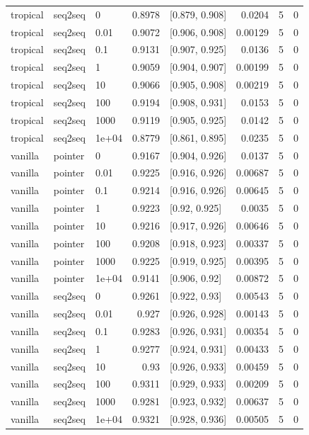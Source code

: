 \documentclass[10pt]{article}
\begin{document}
{\begin{longtable}{lllrlrrr}
tropical & seq2seq & 0 & 0.8978 & [0.879, 0.908] & 0.0204 & 5 & 0\\
tropical & seq2seq & 0.01 & 0.9072 & [0.906, 0.908] & 0.00129 & 5 & 0\\
tropical & seq2seq & 0.1 & 0.9131 & [0.907, 0.925] & 0.0136 & 5 & 0\\
tropical & seq2seq & 1 & 0.9059 & [0.904, 0.907] & 0.00199 & 5 & 0\\
tropical & seq2seq & 10 & 0.9066 & [0.905, 0.908] & 0.00219 & 5 & 0\\
tropical & seq2seq & 100 & 0.9194 & [0.908, 0.931] & 0.0153 & 5 & 0\\
tropical & seq2seq & 1000 & 0.9119 & [0.905, 0.925] & 0.0142 & 5 & 0\\
tropical & seq2seq & 1e+04 & 0.8779 & [0.861, 0.895] & 0.0235 & 5 & 0\\
vanilla & pointer & 0 & 0.9167 & [0.904, 0.926] & 0.0137 & 5 & 0\\
vanilla & pointer & 0.01 & 0.9225 & [0.916, 0.926] & 0.00687 & 5 & 0\\
vanilla & pointer & 0.1 & 0.9214 & [0.916, 0.926] & 0.00645 & 5 & 0\\
vanilla & pointer & 1 & 0.9223 & [0.92, 0.925] & 0.0035 & 5 & 0\\
vanilla & pointer & 10 & 0.9216 & [0.917, 0.926] & 0.00646 & 5 & 0\\
vanilla & pointer & 100 & 0.9208 & [0.918, 0.923] & 0.00337 & 5 & 0\\
vanilla & pointer & 1000 & 0.9225 & [0.919, 0.925] & 0.00395 & 5 & 0\\
vanilla & pointer & 1e+04 & 0.9141 & [0.906, 0.92] & 0.00872 & 5 & 0\\
vanilla & seq2seq & 0 & 0.9261 & [0.922, 0.93] & 0.00543 & 5 & 0\\
vanilla & seq2seq & 0.01 & 0.927 & [0.926, 0.928] & 0.00143 & 5 & 0\\
vanilla & seq2seq & 0.1 & 0.9283 & [0.926, 0.931] & 0.00354 & 5 & 0\\
vanilla & seq2seq & 1 & 0.9277 & [0.924, 0.931] & 0.00433 & 5 & 0\\
vanilla & seq2seq & 10 & 0.93 & [0.926, 0.933] & 0.00459 & 5 & 0\\
vanilla & seq2seq & 100 & 0.9311 & [0.929, 0.933] & 0.00209 & 5 & 0\\
vanilla & seq2seq & 1000 & 0.9281 & [0.923, 0.932] & 0.00637 & 5 & 0\\
vanilla & seq2seq & 1e+04 & 0.9321 & [0.928, 0.936] & 0.00505 & 5 & 0\\
\bottomrule
\end{longtable}
}
\end{document}
